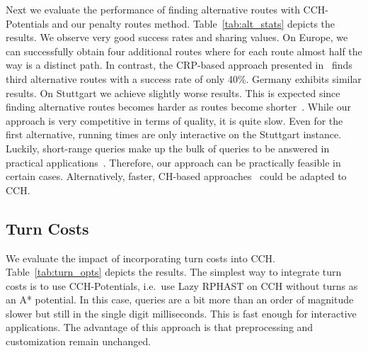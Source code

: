 \documentclass[a4paper, english, cleveref]{lipics-v2021}
\begin{document}
Next we evaluate the performance of finding alternative routes with CCH-Potentials and our penalty routes method.
Table~\ref{tab:alt_stats} depicts the results.
We observe very good success rates and sharing values.
On Europe, we can successfully obtain four additional routes where for each route almost half the way is a distinct path.
In contrast, the CRP-based approach presented in~\cite{DellingGPW17} finds third alternative routes with a success rate of only 40\%.
Germany exhibits similar results.
On Stuttgart we achieve slightly worse results.
This is expected since finding alternative routes becomes harder as routes become shorter~\cite{kobitzsch2015alternative}.
While our approach is very competitive in terms of quality, it is quite slow.
Even for the first alternative, running times are only interactive on the Stuttgart instance.
Luckily, short-range queries make up the bulk of queries to be answered in practical applications~\cite{TODO}.
Therefore, our approach can be practically feasible in certain cases.
Alternatively, faster, CH-based approaches~\cite{TODO} could be adapted to CCH.

\subsection{Turn Costs}

\begin{table}
\centering
\caption{
Performance of different CCH variants and optimizations to support turn costs.
We report the number of directed edges in the augmented graph as well as running times for each phase.
Directed hierarchies imply the removal of infinite shortcuts and reordering separator vertices builds on both directed hierarchies and the removal of infinite shortcuts and all three variants used a cut order.
}\label{tab:turn_opts}

\end{table}

We evaluate the impact of incorporating turn costs into CCH.
Table~\ref{tab:turn_opts} depicts the results.
The simplest way to integrate turn costs is to use CCH-Potentials, i.e.\ use Lazy RPHAST on CCH without turns as an A* potential.
In this case, queries are a bit more than an order of magnitude slower but still in the single digit milliseconds.
This is fast enough for interactive applications.
The advantage of this approach is that preprocessing and customization remain unchanged.
\end{document}
